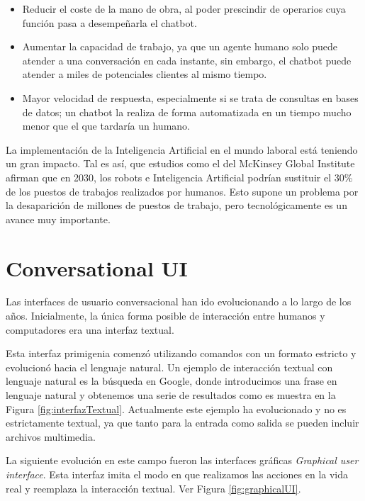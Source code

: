 \begin{itemize}
	\item Reducir el coste de la mano de obra, al poder prescindir de operarios cuya función pasa a desempeñarla el chatbot.
	\item Aumentar la capacidad de trabajo, ya que un agente humano solo puede atender a una conversación en cada instante, sin embargo, el chatbot puede atender a miles de potenciales clientes al mismo tiempo.
	\item Mayor velocidad de respuesta, especialmente si se trata de consultas en bases de datos; un chatbot la realiza de forma automatizada en un tiempo mucho menor que el que tardaría un humano.
\end{itemize}

La implementación de la Inteligencia Artificial en el mundo laboral está teniendo un gran impacto. Tal es así, que estudios como el del McKinsey Global Institute \cite{joblosses} afirman que en 2030, los robots e Inteligencia Artificial podrían sustituir el 30\% de los puestos de trabajos realizados por humanos. Esto supone un problema por la desaparición de millones de puestos de trabajo, pero tecnológicamente es un avance muy importante. 



\newpage

\section{Conversational UI}

Las interfaces de usuario conversacional han ido evolucionando a lo largo de los años. Inicialmente, la única forma posible de interacción entre humanos y computadores era una interfaz textual. 

Esta interfaz primigenia comenzó utilizando comandos con un formato estricto y evolucionó hacia el lenguaje natural. Un ejemplo de interacción textual con lenguaje natural es la búsqueda en Google, donde introducimos una frase en lenguaje natural y obtenemos una serie de resultados como es muestra en la Figura \ref{fig:interfazTextual}. Actualmente este ejemplo ha evolucionado y no es estrictamente textual, ya que tanto para la entrada como salida se pueden incluir archivos multimedia.


La siguiente evolución en este campo fueron las interfaces gráficas \textit{Graphical user interface}. Esta interfaz imita el modo en que realizamos las acciones en la vida real y reemplaza la interacción textual. Ver Figura \ref{fig:graphicalUI}.

